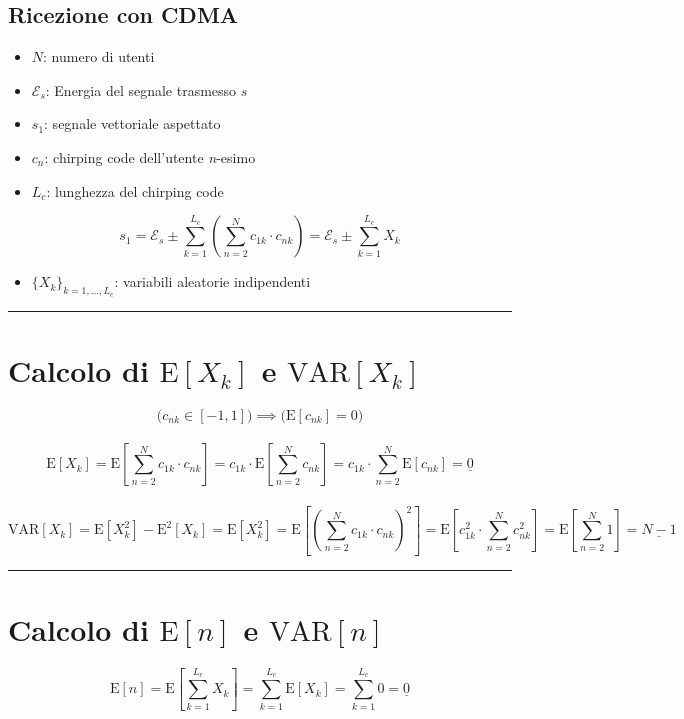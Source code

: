 \documentclass[12pt, a4paper]{article}
\begin{document}
	
\begin{center} \section*{Ricezione con CDMA} \end{center}

\begin{itemize}[itemsep=0pt]
	\item $N$: numero di utenti
	\item $\mathcal{E}_s$: Energia del segnale trasmesso $s$ 
	\item $s_1$: segnale vettoriale aspettato 
	\item $c_n$: chirping code dell'utente \textit{n}-esimo
	\item $L_c$: lunghezza del chirping code
\end{itemize}

\[
s_1 = \mathcal{E}_s \pm \sum_{k=1}^{L_c}\left(\sum_{n=2}^{N}c_{1k}\cdot c_{nk}\right)
  = \mathcal{E}_s \pm \sum_{k=1}^{L_c}X_k
\] 

\begin{itemize}[itemsep=0pt]
	\item $\{X_k\}_{k=1,\dots,L_c}$: variabili aleatorie indipendenti
\end{itemize}
\hrule

\section{Calcolo di $\mathrm{E}[X_k]$ e $\mathrm{VAR}[X_k]$}
\[
\Bigg( c_{nk}\in [-1,1] \Bigg) \implies \Bigg( \mathrm{E}[c_{nk}] = 0 \Bigg)
\] \\\vspace{-.5cm} \[
\mathrm{\mathrm{E}}[X_k] = \mathrm{E}\left[\sum_{n=2}^{N}c_{1k}\cdot c_{nk}\right] 
       = c_{1k}\cdot \mathrm{E}\left[\sum_{n=2}^{N}c_{nk}\right]
       = c_{1k}\cdot \sum_{n=2}^{N}\mathrm{E}[c_{nk}] 
       = \underline{0} 
\] \\\vspace{-.5cm} \[
\mathrm{VAR}[X_k] = \mathrm{E}[X_k^2] - \mathrm{E}^2[X_k] = \mathrm{E}[X_k^2] = \mathrm{E}\left[\left(\sum_{n=2}^{N}c_{1k}\cdot c_{nk}\right)^2\right] =
\mathrm{E}\left[ c_{1k}^2\cdot \sum_{n=2}^{N}c_{nk}^2 \right] =
\mathrm{E}\left[ \sum_{n=2}^{N}1 \right] =
\underline{N-1}
\]
\hrule
	
\section{Calcolo di $\mathrm{E}[n]$ e $\mathrm{VAR}[n]$}
\[
\mathrm{E}[n] = \mathrm{E}\left[ \sum_{k=1}^{L_c}X_k \right] =
\sum_{k=1}^{L_c}\mathrm{E}\left[ X_k \right] = \sum_{k=1}^{L_c}0 = \underline{0}
\] \\\vspace{-1.3cm} 
\end{document}
